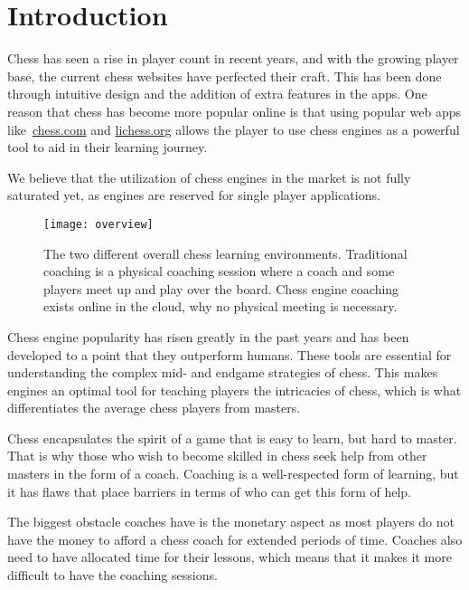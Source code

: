 \chapter{Introduction}\label{ch:introduction}

Chess has seen a rise in player count in recent years, and with the growing player base, the current chess websites have
perfected their craft.
This has been done through intuitive design and the addition of extra features in the apps.
One reason that chess has become more popular online is that using popular web apps like~\url{chess.com} and
\url{lichess.org} allows the player to use chess engines as a powerful tool to aid in their learning journey.

We believe that the utilization of chess engines in the market is not fully saturated yet, as engines are reserved for
single player applications.

\begin{figure}[htb]
    \centering
    \texttt{[image: overview]}
    \caption{The two different overall chess learning environments.
    Traditional coaching is a physical coaching session where a coach and some players meet up and play over the board.
    Chess engine coaching exists online in the cloud, why no physical meeting is necessary.}\label{fig:project-overview}
\end{figure}

Chess engine popularity has risen greatly in the past years and has been developed to a point that they
outperform humans.
These tools are essential for understanding the complex mid- and endgame strategies of chess.
This makes engines an optimal tool for teaching players the intricacies of chess, which is what
differentiates the average chess players from masters.

Chess encapsulates the spirit of a game that is easy to learn, but hard to master.
That is why those who wish to become skilled in chess seek help from other masters in the form of a coach.
Coaching is a well-respected form of learning, but it has flaws that place barriers in terms of who can get this form of
help.

The biggest obstacle coaches have is the monetary aspect as most players do not have the money to afford a chess coach
for extended periods of time.
Coaches also need to have allocated time for their lessons, which means that it makes it more difficult to have the
coaching sessions.

